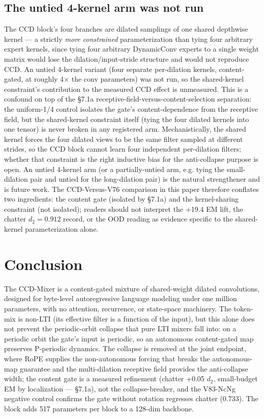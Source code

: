 \documentclass[11pt]{article}
\begin{document}
\subsection{The untied 4-kernel arm was not run}

The CCD block's four branches are dilated samplings of one shared depthwise kernel --- a strictly \emph{more constrained} parameterization than tying four arbitrary expert kernels, since tying four arbitrary DynamicConv experts to a single weight matrix would lose the dilation/input-stride structure and would not reproduce CCD. An untied 4-kernel variant (four separate per-dilation kernels, content-gated, at roughly 4$\times$ the conv parameters) was not run, so the shared-kernel constraint's contribution to the measured CCD effect is unmeasured. This is a confound on top of the \S7.1a receptive-field-versus-content-selection separation: the uniform-1/4 control isolates the gate's content-dependence from the receptive field, but the shared-kernel constraint itself (tying the four dilated kernels into one tensor) is never broken in any registered arm. Mechanistically, the shared kernel forces the four dilated views to be the same filter sampled at different strides, so the CCD block cannot learn four independent per-dilation filters; whether that constraint is the right inductive bias for the anti-collapse purpose is open. An untied 4-kernel arm (or a partially-untied arm, e.g. tying the small-dilation pair and untied for the long-dilation pair) is the natural strengthener and is future work. The CCD-Versus-V76 comparison in this paper therefore conflates two ingredients: the content gate (isolated by \S7.1a) and the kernel-sharing constraint (not isolated); readers should not interpret the +19.4 EM lift, the chatter $d_2 = 0.912$ record, or the OOD reading as evidence specific to the shared-kernel parameterization alone.

\section{Conclusion}

The CCD-Mixer is a content-gated mixture of shared-weight dilated convolutions, designed for byte-level autoregressive language modeling under one million parameters, with no attention, recurrence, or state-space machinery. The token-mix is non-LTI (its effective filter is a function of the input), but this alone does not prevent the periodic-orbit collapse that pure LTI mixers fall into: on a periodic orbit the gate's input is periodic, so an autonomous content-gated map preserves P-periodic dynamics. The collapse is removed at the joint endpoint, where RoPE supplies the non-autonomous forcing that breaks the autonomous-map guarantee and the multi-dilation receptive field provides the anti-collapse width; the content gate is a measured refinement (chatter +0.05 $d_2$, small-budget EM by localization --- \S7.1a), not the collapse-breaker, and the V83-NcNg negative control confirms the gate without rotation regresses chatter (0.733). The block adds 517 parameters per block to a 128-dim backbone.
\end{document}
